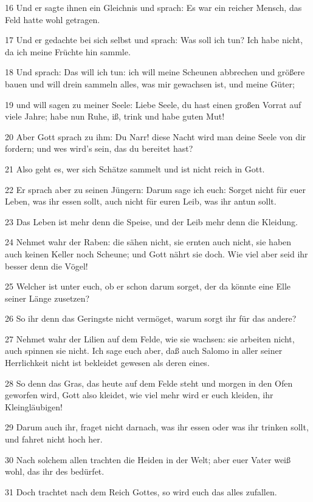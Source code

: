 \par 16 Und er sagte ihnen ein Gleichnis und sprach: Es war ein reicher Mensch, das Feld hatte wohl getragen.
\par 17 Und er gedachte bei sich selbst und sprach: Was soll ich tun? Ich habe nicht, da ich meine Früchte hin sammle.
\par 18 Und sprach: Das will ich tun: ich will meine Scheunen abbrechen und größere bauen und will drein sammeln alles, was mir gewachsen ist, und meine Güter;
\par 19 und will sagen zu meiner Seele: Liebe Seele, du hast einen großen Vorrat auf viele Jahre; habe nun Ruhe, iß, trink und habe guten Mut!
\par 20 Aber Gott sprach zu ihm: Du Narr! diese Nacht wird man deine Seele von dir fordern; und wes wird's sein, das du bereitet hast?
\par 21 Also geht es, wer sich Schätze sammelt und ist nicht reich in Gott.
\par 22 Er sprach aber zu seinen Jüngern: Darum sage ich euch: Sorget nicht für euer Leben, was ihr essen sollt, auch nicht für euren Leib, was ihr antun sollt.
\par 23 Das Leben ist mehr denn die Speise, und der Leib mehr denn die Kleidung.
\par 24 Nehmet wahr der Raben: die sähen nicht, sie ernten auch nicht, sie haben auch keinen Keller noch Scheune; und Gott nährt sie doch. Wie viel aber seid ihr besser denn die Vögel!
\par 25 Welcher ist unter euch, ob er schon darum sorget, der da könnte eine Elle seiner Länge zusetzen?
\par 26 So ihr denn das Geringste nicht vermöget, warum sorgt ihr für das andere?
\par 27 Nehmet wahr der Lilien auf dem Felde, wie sie wachsen: sie arbeiten nicht, auch spinnen sie nicht. Ich sage euch aber, daß auch Salomo in aller seiner Herrlichkeit nicht ist bekleidet gewesen als deren eines.
\par 28 So denn das Gras, das heute auf dem Felde steht und morgen in den Ofen geworfen wird, Gott also kleidet, wie viel mehr wird er euch kleiden, ihr Kleingläubigen!
\par 29 Darum auch ihr, fraget nicht darnach, was ihr essen oder was ihr trinken sollt, und fahret nicht hoch her.
\par 30 Nach solchem allen trachten die Heiden in der Welt; aber euer Vater weiß wohl, das ihr des bedürfet.
\par 31 Doch trachtet nach dem Reich Gottes, so wird euch das alles zufallen.
